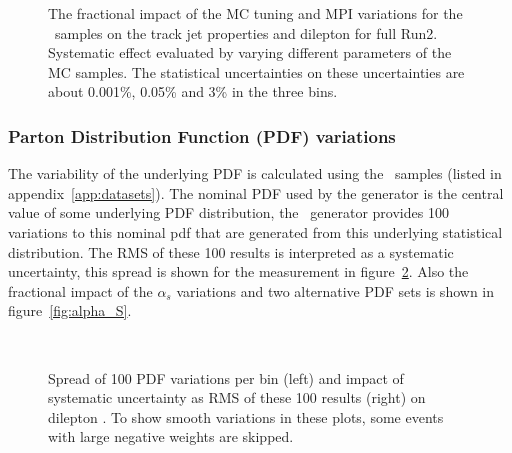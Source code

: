 {\begin{figure}[h!]
  \caption{The fractional impact of the MC tuning and MPI variations for the \pythia~samples on the track jet properties and dilepton \pt for full Run2. Systematic effect evaluated by varying different parameters of the MC samples. The statistical uncertainties on these uncertainties are about 0.001\%, 0.05\% and 3\% in the three bins.}
  \label{fig:PS_MPI}
\end{figure}

\subsubsection{Parton Distribution Function (PDF) variations}
The variability of the underlying PDF is calculated using the \sherpa~samples (listed in appendix~\ref{app:datasets}). The nominal PDF used by the generator is the central value of some underlying PDF distribution, the \sherpa~generator provides 100 variations to this nominal pdf that are generated from this underlying statistical distribution.  The RMS of these 100 results is interpreted as a systematic uncertainty, this spread is shown for the measurement in figure~\ref{fig:PDF_RMS}. Also the fractional impact of the $\alpha_{s}$ variations and two alternative PDF sets is shown in figure~\ref{fig:alpha_S}.
\begin{figure}[h!]
  \centering
   \\
  \caption{Spread of 100 PDF variations per bin (left) and impact of systematic uncertainty as RMS of these 100 results (right) on dilepton \pt. To show smooth variations in these plots, some events with large negative weights are skipped.}
  \label{fig:PDF_RMS}
\end{figure}

}
